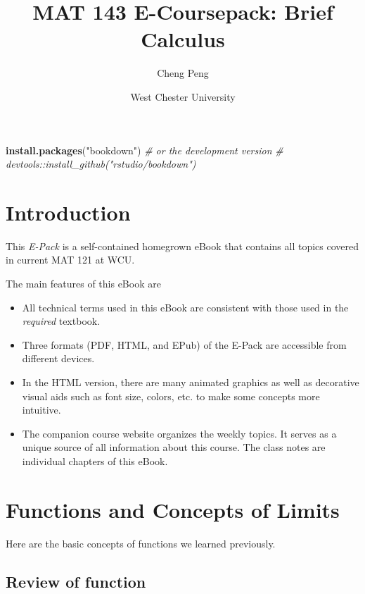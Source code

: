 \documentclass[
]{book}
\title{MAT 143 E-Coursepack: Brief Calculus}
\author{Cheng Peng}
\date{West Chester University}
\newenvironment{Shaded}{\begin{snugshade}}{\end{snugshade}}
\newcommand{\CommentTok}[1]{\textcolor[rgb]{0.56,0.35,0.01}{\textit{#1}}}
\newcommand{\FunctionTok}[1]{\textcolor[rgb]{0.13,0.29,0.53}{\textbf{#1}}}
\newcommand{\NormalTok}[1]{#1}
\newcommand{\StringTok}[1]{\textcolor[rgb]{0.31,0.60,0.02}{#1}}
\begin{document}
\maketitle

{
\setcounter{tocdepth}{1}
\tableofcontents
}
\begin{Shaded}
\begin{Highlighting}[]
\FunctionTok{install.packages}\NormalTok{(}\StringTok{"bookdown"}\NormalTok{)}
\CommentTok{\# or the development version}
\CommentTok{\# devtools::install\_github("rstudio/bookdown")}
\end{Highlighting}
\end{Shaded}

\hypertarget{introduction}{%
\chapter{Introduction}\label{introduction}}

This \emph{E-Pack} is a self-contained homegrown eBook that contains all topics covered in current MAT 121 at WCU.

The main features of this eBook are

\begin{itemize}
\item
  All technical terms used in this eBook are consistent with those used in the \emph{required} textbook.
\item
  Three formats (PDF, HTML, and EPub) of the E-Pack are accessible from different devices.
\item
  In the HTML version, there are many animated graphics as well as decorative visual aids such as font size, colors, etc. to make some concepts more intuitive.
\item
  The companion course website organizes the weekly topics. It serves as a unique source of all information about this course. The class notes are individual chapters of this eBook.
\end{itemize}

\hypertarget{functions-and-concepts-of-limits}{%
\chapter{Functions and Concepts of Limits}\label{functions-and-concepts-of-limits}}

Here are the basic concepts of functions we learned previously.

\hypertarget{review-of-function}{%
\section{Review of function}\label{review-of-function}}
\end{document}
